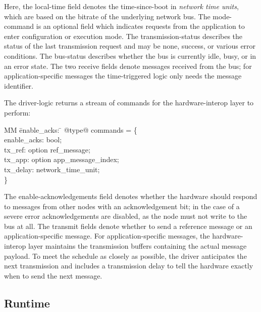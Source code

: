 Here, the local-time field denotes the time-since-boot in \emph{network time units}, which are based on the bitrate of the underlying network bus.
The mode-command is an optional field which indicates requests from the application to enter configuration or execution mode.
The transmission-status describes the status of the last transmission request and may be none, success, or various error conditions.
The bus-status describes whether the bus is currently idle, busy, or in an error state.
The two receive fields denote messages received from the bus; for application-specific messages the time-triggered logic only needs the message identifier.

The driver-logic returns a stream of commands for the hardware-interop layer to perform:

\begin{tabbing}
  MM \= enable_acks: \= \kill
  @type@ commands = \{ \\
  \> enable_acks: \> bool; \\
  \> tx_ref: \>       option ref_message; \\
  \> tx_app: \> option app_message_index; \\
  \> tx_delay: \>     network_time_unit; \\
 \}
\end{tabbing}

The enable-acknowledgements field denotes whether the hardware should respond to messages from other nodes with an acknowledgement bit; in the case of a severe error acknowledgements are disabled, as the node must not write to the bus at all.
The transmit fields denote whether to send a reference message or an application-specific message.
For application-specific messages, the hardware-interop layer maintains the transmission buffers containing the actual message payload.
To meet the schedule as closely as possible, the driver anticipates the next transmission and includes a transmission delay to tell the hardware exactly when to send the next message.

\subsection{Runtime}

